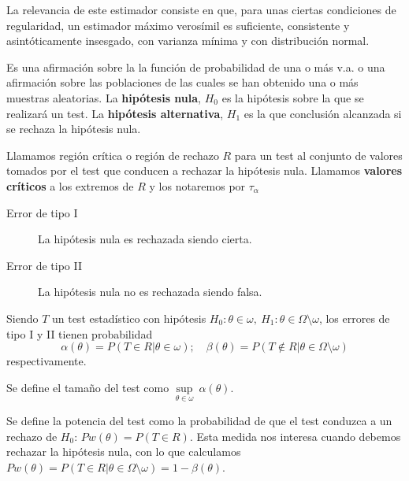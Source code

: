 	La relevancia de este estimador consiste en que, para 
unas ciertas condiciones de regularidad, un estimador máximo 
verosímil es suficiente, consistente y asintóticamente 
insesgado, con varianza mínima y con distribución normal.
	
\begin{definicion}
	Es una afirmación sobre la la función de probabilidad de 
una o más v.a. o una afirmación sobre las poblaciones de las 
cuales se han obtenido una o más muestras aleatorias. La 
\textbf{hipótesis nula}, $H_0$ es la hipótesis sobre la que 
se realizará un test. La \textbf{hipótesis alternativa}, 
$H_1$ es la que conclusión alcanzada si se rechaza la 
hipótesis nula.
\end{definicion}

\begin{definicion}
	Llamamos región crítica o región de rechazo $R$ para un 
test al conjunto de valores tomados por el test que conducen 
a rechazar la hipótesis nula. Llamamos \textbf{valores 
críticos} a los extremos de $R$ y los notaremos por $\tau_
\alpha$
\end{definicion}

\begin{definicion}\textit{}
	\begin{description}
	\item[Error de tipo I] La hipótesis nula es rechazada 
		siendo cierta.
	\item[Error de tipo II] La hipótesis nula no es rechazada 
		siendo falsa.
	\end{description}
\end{definicion}

	Siendo $T$ un test estadístico con hipótesis $H_0: \theta 
\in \omega, \ H_1: \theta \in \Omega \setminus \omega$, los 
errores de tipo I y II tienen probabilidad
	\[ 
	\alpha(\theta) = P(T \in R | \theta \in \omega); \quad
	\beta(\theta) = 
		P(T \not\in R | 
				\theta \in \Omega \setminus \omega)
	\]
	respectivamente.

\begin{definicion}
	Se define el tamaño del test como $\underset{\theta \in 
	\omega}{\sup}\ \alpha(\theta)$.
\end{definicion}

\begin{definicion}
	Se define la potencia del test como la probabilidad de 
que el test conduzca a un rechazo de $H_0$: $Pw(\theta) = P(T 
\in R)$. Esta medida nos interesa cuando debemos rechazar la 
hipótesis nula, con lo que calculamos $Pw(\theta) = P(T \in R 
| \theta \in \Omega \setminus \omega) = 1 - \beta(\theta)$. 
\end{definicion}
	
